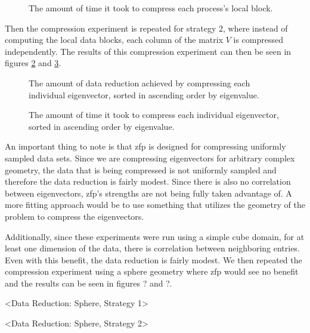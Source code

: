 \begin{figure}
	\caption{The amount of time it took to compress each process's local block.}
	\label{fig:compress2}
	
\end{figure}

Then the compression experiment is repeated for strategy 2, where instead of computing the local data blocks, each column of the matrix $V$ is compressed independently. The results of this compression experiment can then be seen in figures \ref{fig:reduce1} and \ref{fig:compress1}.

\begin{figure}
	\caption{The amount of data reduction achieved by compressing each individual eigenvector, sorted in ascending order by eigenvalue.}
	\label{fig:reduce1}
	
\end{figure}

\begin{figure}
	\caption{The amount of time it took to compress each individual eigenvector, sorted in ascending order by eigenvalue.}
	\label{fig:compress1}
	
\end{figure}

An important thing to note is that zfp is designed for compressing uniformly sampled data sets. Since we are compressing eigenvectors for arbitrary complex geometry, the data that is being compressed is not uniformly sampled and therefore the data reduction is fairly modest. Since there is also no correlation between eigenvectors, zfp's strengths are not being fully taken advantage of. A more fitting approach would be to use something that utilizes the geometry of the problem to compress the eigenvectors.

Additionally, since these experiments were run using a simple cube domain, for at least one dimension of the data, there is correlation between neighboring entries. Even with this benefit, the data reduction is fairly modest. We then repeated the compression experiment using a sphere geometry where zfp would see no benefit and the results can be seen in figures ? and ?.

{\color{blue} <Data Reduction: Sphere, Strategy 1> }

{\color{blue} <Data Reduction: Sphere, Strategy 2> }